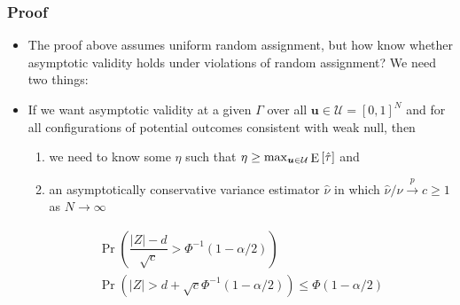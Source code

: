 \documentclass[table, xcolor = {dvipsnames}, 9pt]{beamer}
\theoremstyle{plain}
\DeclareMathOperator{\E}{\rm{E}}
\begin{document}
\begin{frame}[t]
\frametitle{Proof} 
\vfill
\begin{itemize}
\item The proof above assumes uniform random assignment, but how know whether asymptotic validity holds under violations of random assignment? We need two things:
\item If we want asymptotic validity at a given $\Gamma$ over all $\bm{u} \in \mathcal{U} = [0, 1]^N$ and for all configurations of potential outcomes consistent with weak null, then
\begin{enumerate}
\item we need to know some $\eta$ such that $\eta \geq \max_{\bm{u} \in \mathcal{U}} \E\left[\hat{\tau}\right]$ and
\item an asymptotically conservative variance estimator $\hat{\nu}$ in which $\hat{\nu} / \nu \overset{p}{\to} c \geq 1$ as $N \to \infty$
\end{enumerate}
\begin{align*}
\Pr\left(\dfrac{\left\lvert Z \right\rvert - d}{\sqrt{c}} > \Phi^{-1}(1 - \alpha / 2)\right) \\ 
\Pr\left(\left\lvert Z \right\rvert > d + \sqrt{c}\Phi^{-1}(1 - \alpha / 2)\right) \leq \Phi(1 - \alpha/2)
\end{align*}
\end{itemize}
\vfill
\end{frame}
\end{document}

